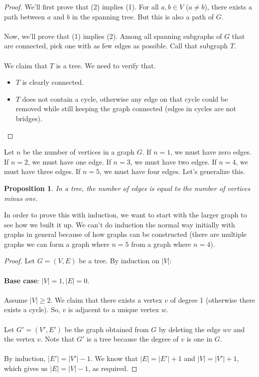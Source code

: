 \documentclass[]{article}
\newtheorem*{proposition}{Proposition}
\theoremstyle{definition}
\begin{document}
			\begin{proof}
				We'll first prove that (2) implies (1). For all $a, b \in V$ ($a \ne b$), there exists a path between $a$ and $b$ in the spanning tree. But this is also a path of $G$.
				\\ \\
				Now, we'll prove that (1) implies (2). Among all spanning subgraphs of $G$ that are connected, pick one with as few edges as possible. Call that subgraph $T$.
				\\ \\
				We claim that $T$ is a tree. We need to verify that.
				\begin{itemize}
					\item $T$ is clearly connected.
					\item $T$ does not contain a cycle, otherwise any edge on that cycle could be removed while still keeping the graph connected (edges in cycles are not bridges).
				\end{itemize}
			\end{proof}

			Let $n$ be the number of vertices in a graph $G$. If $n = 1$, we must have zero edges. If $n = 2$, we must have one edge. If $n = 3$, we must have two edges. If $n = 4$, we must have three edges. If $n = 5$, we must have four edges. Let's generalize this.

			\begin{proposition}
				In a tree, the number of edges is equal to the number of vertices minus one.
			\end{proposition}

			In order to prove this with induction, we want to start with the larger graph to see how we built it up. We can't do induction the normal way initially with graphs in general because of how graphs can be constructed (there are multiple graphs we can form a graph where $n = 5$ from a graph where $n = 4$).

			\begin{proof}
				Let $G = (V, E)$ be a tree. By induction on $|V|$:
				\\ \\
				\textbf{Base case}: $|V| = 1, |E| = 0$.
				\\ \\
				Assume $|V| \ge 2$. We claim that there exists a vertex $v$ of degree 1 (otherwise there exists a cycle). So, $v$ is adjacent to a unique vertex $w$.
				\\ \\
				Let $G' = (V', E')$ be the graph obtained from $G$ by deleting the edge $wv$ and the vertex $v$. Note that $G'$ is a tree because the degree of $v$ is one in $G$.
				\\ \\
				By induction, $|E'| = |V'| - 1$. We know that $|E| = |E'| + 1$ and $|V| = |V'| + 1$, which gives us $|E| = |V| - 1$, as required.
			\end{proof}
\end{document}
